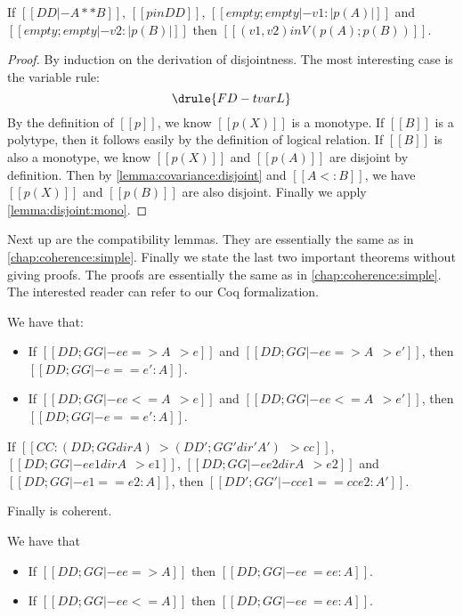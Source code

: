 \begin{lemma}
  If $[[DD |- A ** B]]$, $[[ p in DD  ]]$, $[[  empty ; empty |-  v1 : |p (A)|  ]]$ and $[[  empty ; empty |-  v2 : |p (B)|  ]]$
  then $[[   (v1, v2) in V ( p(A) ; p(B)  )    ]]$.
\end{lemma}
\begin{proof}
  By induction on the derivation of disjointness. The most interesting case is the variable rule:
  \[
    \drule{FD-tvarL}
  \]
  By the definition of $[[p]]$, we know $[[p(X)]]$ is a monotype. If $[[B]]$ is
  a polytype, then it follows easily by the definition of logical relation. If
  $[[B]]$ is also a monotype, we know $[[p(X)]]$ and $[[p(A)]]$ are disjoint by
  definition. Then by \cref{lemma:covariance:disjoint} and $[[A <: B]]$,
  we have $[[p(X)]]$ and $[[p(B)]]$ are also disjoint. Finally we apply
  \cref{lemma:disjoint:mono}.
\end{proof}


Next up are the compatibility lemmas. They are essentially the same as in
\cref{chap:coherence:simple}. Finally we state the last two important theorems
without giving proofs. The proofs are essentially the same as in
\cref{chap:coherence:simple}. The interested reader can refer to our Coq
formalization.

\begin{theorem} We have that:
  \begin{itemize}
  \item If $[[DD; GG |- ee => A ~~> e]]$ and $[[DD; GG |- ee => A ~~> e']]$, then $[[DD; GG |- e == e' : A ]]$.
  \item If $[[DD ; GG |- ee <= A ~~> e]]$ and $[[DD ; GG |- ee <= A ~~> e']]$, then $[[DD; GG |- e == e' : A ]]$.
  \end{itemize}
\end{theorem}

\begin{theorem}[Congruence]
 If $[[CC : (DD ; GG dir A) ~> (DD' ; GG' dir' A') ~~> cc]]$, $[[DD ; GG |- ee1 dir A ~~> e1]]$, $[[DD ; GG |- ee2 dir A ~~> e2]]$
 and $[[DD ; GG |- e1 == e2 : A ]]$, then $[[DD' ; GG' |- cc{e1} == cc{e2} : A']]$.
\end{theorem}

Finally \fnamee is coherent.

\begin{theorem} We have that
  \begin{itemize}
  \item If $[[DD ; GG |- ee => A ]]$ then $[[DD ; GG |- ee ~= ee : A]]$.
  \item If $[[DD ; GG |- ee <= A ]]$ then $[[DD ; GG |- ee ~= ee : A]]$.
  \end{itemize}
\end{theorem}


